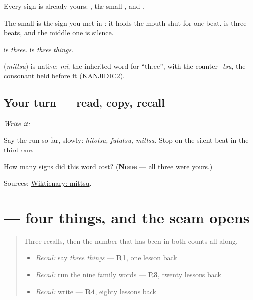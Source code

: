 Every sign is already yours: \textbf{}, the small \textbf{}, and \textbf{}.

The small \textbf{} is the sign you met in \textbf{}: it holds the mouth shut for one beat. \textbf{} is three beats, and the middle one is silence.

\textbf{} is \emph{three}. \textbf{} is \emph{three things}.

\begin{cousinweb}
\textbf{} (\emph{mittsu}) is native: \emph{mi}, the inherited word for \textquotedblleft{}three\textquotedblright{}, with the counter \emph{-tsu}, the consonant held before it (KANJIDIC2).
\end{cousinweb}

\subsection*{Your turn — read, copy, recall}
\emph{Write it:} \textbf{}

Say the run so far, slowly: \emph{hitotsu, futatsu, mittsu}. Stop on the silent beat in the third one.

\begin{tcolorbox}[breakable,colback=teal!4,colframe=teal!35!black,title={Before you move on}]
How many signs did this word cost? (\textbf{None} — all three were yours.)

Sources: \href{https://en.wiktionary.org/wiki/\%E4\%B8\%89\%E3\%81\%A4}{Wiktionary: mittsu}.
\end{tcolorbox}
\section[\texorpdfstring{\ja{よっつ} (yottsu)}{よっつ (yottsu)}]{ — four things, and the seam opens}

\label{lesson:JA-C16-yottsu}



\begin{quote}
Three recalls, then the number that has been in both counts all along.

\begin{itemize}
\raggedright
  \item \emph{Recall:} say \emph{three things} — \textbf{R1}, one lesson back
  \item \emph{Recall:} run the nine family words — \textbf{R3}, twenty lessons back
  \item \emph{Recall:} write \textbf{} — \textbf{R4}, eighty lessons back
\end{itemize}
\end{quote}

